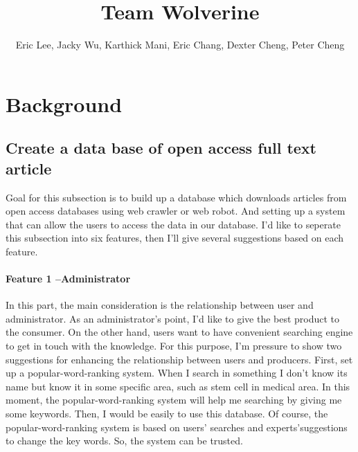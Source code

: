 
\title{Team Wolverine}
\author{Eric Lee, Jacky Wu, Karthick Mani, Eric Chang, Dexter Cheng, Peter Cheng} 		
\maketitle                     
	
\section*{Background}
\label{background}
	
\subsection*{Create a data base of open access full text article}
\label{task1}

Goal for this subsection is to build up a database which downloads articles from open access databases using web crawler or web robot. And setting up a system that can allow the users to access the data in our database. I'd like to seperate this subsection into six features, then I'll give several suggestions based on each feature. 

\paragraph*{Feature 1 --Administrator}
\label{task1:part1}

In this part, the main consideration is the relationship between user and administrator. As an administrator's point, I'd like to give the best product to the consumer. On the other hand, users want to have convenient searching engine to get in touch with the knowledge. For this purpose, I'm pressure to show two suggestions for enhancing the relationship between users and producers. First, set up a popular-word-ranking system. When I search in something I don't know its name but know it in some specific area, such as stem cell in medical area. In this moment, the popular-word-ranking system will help me searching by giving me some keywords. Then, I would be easily to use this database. Of course, the popular-word-ranking system is based on users' searches and experts'suggestions to change the key words. So, the system can be trusted. 
	
